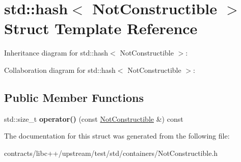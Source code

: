 \hypertarget{structstd_1_1hash_3_01_not_constructible_01_4}{}\section{std\+:\+:hash$<$ Not\+Constructible $>$ Struct Template Reference}
\label{structstd_1_1hash_3_01_not_constructible_01_4}


Inheritance diagram for std\+:\+:hash$<$ Not\+Constructible $>$\+:


Collaboration diagram for std\+:\+:hash$<$ Not\+Constructible $>$\+:
\subsection*{Public Member Functions}
\begin{DoxyCompactItemize}
\item 
\mbox{\label{structstd_1_1hash_3_01_not_constructible_01_4_ab7a48fc6e7ab9ad2165eb22fd8ff8069}} 
std\+::size\+\_\+t {\bfseries operator()} (const \mbox{\hyperlink{class_not_constructible}{Not\+Constructible}} \&) const
\end{DoxyCompactItemize}


The documentation for this struct was generated from the following file\+:\begin{DoxyCompactItemize}
\item 
contracts/libc++/upstream/test/std/containers/Not\+Constructible.\+h\end{DoxyCompactItemize}
